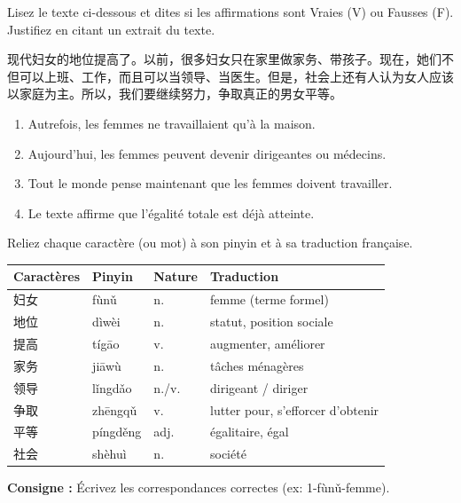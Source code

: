 \documentclass[11pt]{article}
\begin{document}
\begin{exercice}
Lisez le texte ci-dessous et dites si les affirmations sont Vraies (V) ou Fausses (F). Justifiez en citant un extrait du texte.
\begin{textebox}
现代妇女的地位提高了。以前，很多妇女只在家里做家务、带孩子。现在，她们不但可以上班、工作，而且可以当领导、当医生。但是，社会上还有人认为女人应该以家庭为主。所以，我们要继续努力，争取真正的男女平等。
\end{textebox}
\begin{enumerate}
    \item Autrefois, les femmes ne travaillaient qu'à la maison.
    \item Aujourd'hui, les femmes peuvent devenir dirigeantes ou médecins.
    \item Tout le monde pense maintenant que les femmes doivent travailler.
    \item Le texte affirme que l'égalité totale est déjà atteinte.
\end{enumerate}
\end{exercice}

\begin{exercice}
Reliez chaque caractère (ou mot) à son pinyin et à sa traduction française.
\begin{center}
\begin{tabularx}{\linewidth}{|X|X|X|X|}
\hline
\rowcolor{popblueL} Caractères & Pinyin & Nature & Traduction \\ \hline
妇女 & fùnǔ & n. & femme (terme formel) \\ \hline
地位 & dìwèi & n. & statut, position sociale \\ \hline
提高 & tígāo & v. & augmenter, améliorer \\ \hline
家务 & jiāwù & n. & tâches ménagères \\ \hline
领导 & lǐngdǎo & n./v. & dirigeant / diriger \\ \hline
争取 & zhēngqǔ & v. & lutter pour, s'efforcer d'obtenir \\ \hline
平等 & píngděng & adj. & égalitaire, égal \\ \hline
社会 & shèhuì & n. & société \\ \hline
\end{tabularx}
\end{center}
\textbf{Consigne :} Écrivez les correspondances correctes (ex: 1-fùnǔ-femme).
\end{exercice}
\end{document}
